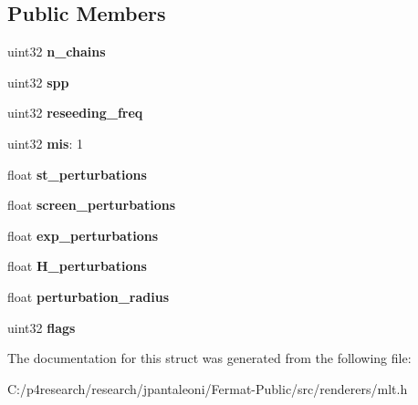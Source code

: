 \subsection*{Public Members}
\begin{DoxyCompactItemize}
\item 
\mbox{\label{struct_m_l_t_options_a18382f067bb09686ef584c8dcefda3e7}} 
uint32 {\bfseries n\+\_\+chains}
\item 
\mbox{\label{struct_m_l_t_options_ae535e8ebd61a70e31a38841199658664}} 
uint32 {\bfseries spp}
\item 
\mbox{\label{struct_m_l_t_options_a6e30a0f1cb0b617aeb34a7d8a6c7837a}} 
uint32 {\bfseries reseeding\+\_\+freq}
\item 
\mbox{\label{struct_m_l_t_options_a4f9982361eba08c6c0b2e97e9c1912c3}} 
uint32 {\bfseries mis}\+: 1
\item 
\mbox{\label{struct_m_l_t_options_af237541d6431d255751da45676d52b41}} 
float {\bfseries st\+\_\+perturbations}
\item 
\mbox{\label{struct_m_l_t_options_a2e096ece8892de850873cee9d68a1d74}} 
float {\bfseries screen\+\_\+perturbations}
\item 
\mbox{\label{struct_m_l_t_options_adc787450d3998f627ec2334f06bb18b5}} 
float {\bfseries exp\+\_\+perturbations}
\item 
\mbox{\label{struct_m_l_t_options_a9425d7ceff6d24343fe6c056f012b525}} 
float {\bfseries H\+\_\+perturbations}
\item 
\mbox{\label{struct_m_l_t_options_a04730dcf2df363ca79596457039108f0}} 
float {\bfseries perturbation\+\_\+radius}
\item 
\mbox{\label{struct_m_l_t_options_a6e6d5a6692c663f09782f648351b2963}} 
uint32 {\bfseries flags}
\end{DoxyCompactItemize}


The documentation for this struct was generated from the following file\+:\begin{DoxyCompactItemize}
\item 
C\+:/p4research/research/jpantaleoni/\+Fermat-\/\+Public/src/renderers/mlt.\+h\end{DoxyCompactItemize}
